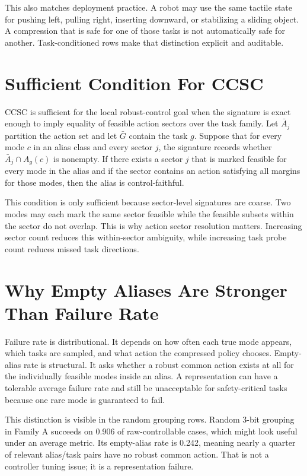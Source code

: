 \documentclass{article}
\begin{document}
This also matches deployment practice. A robot may use the same tactile state for pushing left, pulling right, inserting downward, or stabilizing a sliding object. A compression that is safe for one of those tasks is not automatically safe for another. Task-conditioned rows make that distinction explicit and auditable.

\section{Sufficient Condition For CCSC}
CCSC is sufficient for the local robust-control goal when the signature is exact enough to imply equality of feasible action sectors over the task family. Let $\bar A_j$ partition the action set and let $\bar G$ contain the task $g$. Suppose that for every mode $c$ in an alias class and every sector $j$, the signature records whether $\bar A_j\cap A_g(c)$ is nonempty. If there exists a sector $j$ that is marked feasible for every mode in the alias and if the sector contains an action satisfying all margins for those modes, then the alias is control-faithful.

This condition is only sufficient because sector-level signatures are coarse. Two modes may each mark the same sector feasible while the feasible subsets within the sector do not overlap. This is why action sector resolution matters. Increasing sector count reduces this within-sector ambiguity, while increasing task probe count reduces missed task directions.

\section{Why Empty Aliases Are Stronger Than Failure Rate}
Failure rate is distributional. It depends on how often each true mode appears, which tasks are sampled, and what action the compressed policy chooses. Empty-alias rate is structural. It asks whether a robust common action exists at all for the individually feasible modes inside an alias. A representation can have a tolerable average failure rate and still be unacceptable for safety-critical tasks because one rare mode is guaranteed to fail.

This distinction is visible in the random grouping rows. Random 3-bit grouping in Family A succeeds on 0.906 of raw-controllable cases, which might look useful under an average metric. Its empty-alias rate is 0.242, meaning nearly a quarter of relevant alias/task pairs have no robust common action. That is not a controller tuning issue; it is a representation failure.
\end{document}
